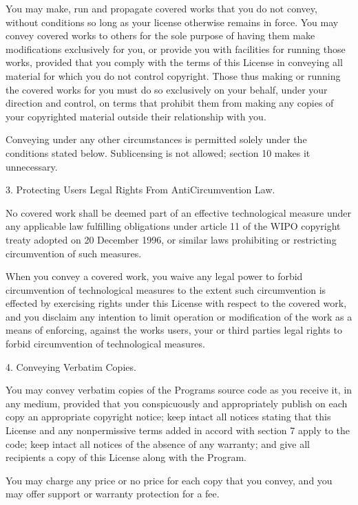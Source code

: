 \documentclass[letterpaper,10pt,english]{sphinxmanual}
\begin{document}
\begin{sphinxVerbatim}[commandchars=\\\{\}]
   You may make, run and propagate covered works that you do not convey,
   without conditions so long as your license otherwise remains in force. You
   may convey covered works to others for the sole purpose of having them make
   modifications exclusively for you, or provide you with facilities for
   running those works, provided that you comply with the terms of this License
   in conveying all material for which you do not control copyright. Those thus
   making or running the covered works for you must do so exclusively on your
   behalf, under your direction and control, on terms that prohibit them from
   making any copies of your copyrighted material outside their relationship
   with you.

   Conveying under any other circumstances is permitted solely under the
   conditions stated below. Sublicensing is not allowed; section 10 makes it
   unnecessary.

 3. Protecting Users\PYGZsq{} Legal Rights From Anti\PYGZhy{}Circumvention Law.

   No covered work shall be deemed part of an effective technological measure
   under any applicable law fulfilling obligations under article 11 of the WIPO
   copyright treaty adopted on 20 December 1996, or similar laws prohibiting or
   restricting circumvention of such measures.

   When you convey a covered work, you waive any legal power to forbid
   circumvention of technological measures to the extent such circumvention is
   effected by exercising rights under this License with respect to the covered
   work, and you disclaim any intention to limit operation or modification of
   the work as a means of enforcing, against the work\PYGZsq{}s users, your or third
   parties\PYGZsq{} legal rights to forbid circumvention of technological measures.

 4. Conveying Verbatim Copies.

   You may convey verbatim copies of the Program\PYGZsq{}s source code as you receive
   it, in any medium, provided that you conspicuously and appropriately publish
   on each copy an appropriate copyright notice; keep intact all notices
   stating that this License and any non\PYGZhy{}permissive terms added in accord with
   section 7 apply to the code; keep intact all notices of the absence of any
   warranty; and give all recipients a copy of this License along with the
   Program.

   You may charge any price or no price for each copy that you convey, and you
   may offer support or warranty protection for a fee.


\end{sphinxVerbatim}
\end{document}
